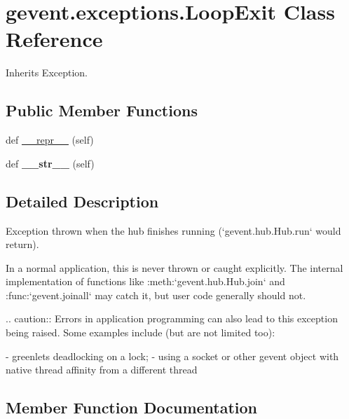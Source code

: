\hypertarget{classgevent_1_1exceptions_1_1_loop_exit}{}\section{gevent.\+exceptions.\+Loop\+Exit Class Reference}
\label{classgevent_1_1exceptions_1_1_loop_exit}


Inherits Exception.

\subsection*{Public Member Functions}
\begin{DoxyCompactItemize}
\item 
def \hyperlink{classgevent_1_1exceptions_1_1_loop_exit_ac8a83fb10824f6ed41d90616921e31a6}{\+\_\+\+\_\+repr\+\_\+\+\_\+} (self)
\item 
\mbox{\label{classgevent_1_1exceptions_1_1_loop_exit_aaf46dfdf21e5d152f69b39d8f9d36f8c}} 
def {\bfseries \+\_\+\+\_\+str\+\_\+\+\_\+} (self)
\end{DoxyCompactItemize}


\subsection{Detailed Description}
\begin{DoxyVerb}Exception thrown when the hub finishes running (`gevent.hub.Hub.run`
would return).

In a normal application, this is never thrown or caught
explicitly. The internal implementation of functions like
:meth:`gevent.hub.Hub.join` and :func:`gevent.joinall` may catch it, but user code
generally should not.

.. caution::
   Errors in application programming can also lead to this exception being
   raised. Some examples include (but are not limited too):

   - greenlets deadlocking on a lock;
   - using a socket or other gevent object with native thread
     affinity from a different thread\end{DoxyVerb}
 

\subsection{Member Function Documentation}
\mbox{\label{classgevent_1_1exceptions_1_1_loop_exit_ac8a83fb10824f6ed41d90616921e31a6}} 
